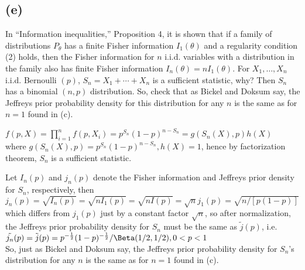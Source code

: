 \subsection*{(e)}
\ProbS
In ``Information inequalities,'' Proposition 4, it is shown that if a family of distributions $P_{\theta}$ has a finite Fisher information $I_1(\theta)$ and a regularity condition (2) holds, then the Fisher information for $n$ i.i.d. variables with a distribution in the family also has finite Fisher information $I_{n}(\theta) = nI_1(\theta)$.
For $X_1, \dots, X_n$ i.i.d. Bernoulli $(p)$, $S_n = X_1 + \cdots + X_n$ is a sufficient statistic, why?
Then $S_n$ has a binomial $(n, p)$ distribution. So, check that as Bickel and Doksum say, the Jeffreys prior probability density for this distribution for any $n$ is the same as for $n=1$ found in (c).
\ProbE

$
f(p, X) = \prod_{i=1}^{n} f(p, X_i) =
p^{S_n}(1-p)^{n-S_n}
= g(S_n(X), p)h(X)
$
\\
where
$
g(S_n(X), p) =
p^{S_n}(1-p)^{n-S_n}
,
h(X)=1
$,
hence by factorization theorem, $S_n$ is a sufficient statistic.

Let $I_n(p)$ and $j_n(p)$ denote the Fisher information and Jeffreys prior density for $S_n$, respectively, then
\\
$
j_n(p) = \sqrt{I_n(p)}
= \sqrt{nI_1(p)}
= \sqrt{nI(p)}
= \sqrt{n}j_1(p)
= \sqrt{n / [p(1-p)]}
$
\\
which differs from $j_1(p)$ just by a constant factor $\sqrt{n}$,
so after normalization, the Jeffreys prior probability density for $S_n$ must be the same as $\tilde{j}(p)$, i.e.
\\
$
\tilde{j_n}(p) = \tilde{j}(p) = 
p^{-\frac{1}{2}}(1-p)^{-\frac{1}{2}}/\Beta(1/2, 1/2), 0<p<1
$
\\
So, just as Bickel and Doksum say, the Jeffreys prior probability density for $S_n$'s distribution for any $n$ is the same as for $n = 1$ found in (c).

